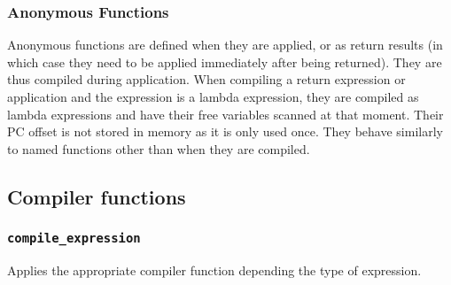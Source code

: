 \subsubsection{Anonymous Functions}
Anonymous functions are defined when they are applied, or as return results (in which case they need to be applied immediately after being returned). They are thus compiled during application. When compiling a return expression or application and the expression is a lambda expression, they are compiled as lambda expressions and have their free variables scanned at that moment. Their PC offset is not stored in memory as it is only used once. They behave similarly to named functions other than when they are compiled. 



\subsection{Compiler functions}
\subsubsection{\texttt{compile\_expression}}
Applies the appropriate compiler function depending the type of expression. \\\\
\begin{prooftree}
\end{prooftree}
